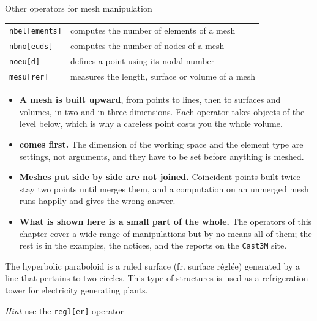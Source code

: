 \begin{gbox}{Other operators for mesh manipulation}
\begin{tabular}{ll}
\texttt{nbel[ements]} & computes the number of elements of a mesh \\
\texttt{nbno[euds]} & computes the number of nodes of a mesh \\
\texttt{noeu[d]} &  defines a point using its nodal number \\[2.mm]
\texttt{mesu[rer]} & measures the length, surface or volume of a mesh \\
\end{tabular}
\end{gbox}


\begin{gbox*}
\begin{itemize}
  \item \textbf{A mesh is built upward}, from points to lines, then to
  surfaces and volumes, in two and in three dimensions. Each operator takes
  objects of the level below, which is why a careless point costs you the
  whole volume.
  \item \textbf{ comes first.} The dimension of the working
  space and the element type are settings, not arguments, and they have to
  be set before anything is meshed.
  \item \textbf{Meshes put side by side are not joined.} Coincident points
  built twice stay two points until  merges them, and a
  computation on an unmerged mesh runs happily and gives the wrong answer.
  \item \textbf{What is shown here is a small part of the whole.} The
  operators of this chapter cover a wide range of manipulations but by no
  means all of them; the rest is in the examples, the notices, and the
  reports on the \texttt{Cast3M} site.
\end{itemize}
\end{gbox*}




The hyperbolic paraboloid is a ruled surface (fr. surface r\'egl\'ee) generated by a line 
that pertains to two circles. This type of structures is used as a refrigeration 
tower for electricity generating plants. 

{\small \textit{Hint} use the \texttt{regl[er]} operator}





